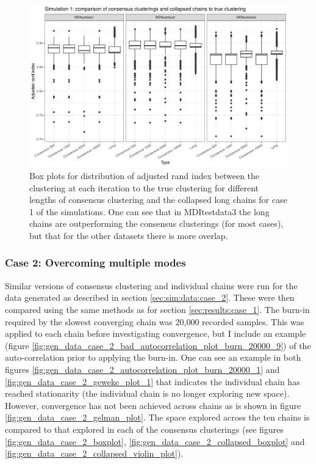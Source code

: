 \documentclass[12pt]{article} %
\begin{document}
		\begin{figure}[!htb]
			\centering
			\includegraphics[scale=0.65]{Images/Gen_data/Case_1/box_plot_ari_true_clustering_collapsed_long_burn_in.png}
			\caption{Box plots for distribution of adjusted rand index between the clustering at each iteration to the true clustering for different lengths of consensus clustering and the collapsed long chains for case 1 of the simulations. One can see that in MDItestdata3 the long chains are outperforming the consensus clusterings (for most cases), but that for the other datasets there is more overlap.}
			\label{fig:gen_data_case_1_collapsed_boxplot}
		\end{figure}
		

	
	\subsubsection{Case 2: Overcoming multiple modes} \label{sec:results:case_2}
	Similar versions of consensus clustering and individual chains were run for the data generated as described in section \ref{sec:sim:data:case_2}. These were then compared using the same methods as for section \ref{sec:results:case_1}. The burn-in required by the slowest converging chain was 20,000 recorded samples. This was applied to each chain before investigating convergence, but I include an example (figure \ref{fig:gen_data_case_2_bad_autocorrelation_plot_burn_20000_9}) of the auto-correlation prior to applying the burn-in. One can see an example in both figures \ref{fig:gen_data_case_2_autocorrelation_plot_burn_20000_1} and \ref{fig:gen_data_case_2_geweke_plot_1} that indicates the individual chain has reached stationarity (the individual chain is no longer exploring new space). However, convergence has not been achieved across chains as is shown in figure \ref{fig:gen_data_case_2_gelman_plot}. The space explored across the ten chains is compared to that explored in each of the consensus clusterings (see figures \ref{fig:gen_data_case_2_boxplot}, \ref{fig:gen_data_case_2_collapsed_boxplot} and \ref{fig:gen_data_case_2_collapsed_violin_plot}).
	
\end{document}
